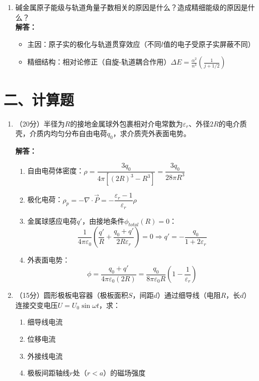 \documentclass{article}
\begin{document}
\begin{enumerate}[label=\arabic*.]
    \item 碱金属原子能级与轨道角量子数相关的原因是什么？造成精细能级的原因是什么？\\
    \textbf{解答：}
    \begin{itemize}
        \item 主因：原子实的极化与轨道贯穿效应（不同$l$值的电子受原子实屏蔽不同）
        \item 精细结构：相对论修正（自旋-轨道耦合作用）$\Delta E = \frac{\alpha^2}{n^3}\left( \frac{1}{j+1/2} \right)$
    \end{itemize}
\end{enumerate}

\section*{二、计算题}
\begin{enumerate}[label=\arabic*.]
    \item （20分）半径为$R$的接地金属球外包裹相对介电常数为$\varepsilon_r$、外径$2R$的电介质壳，介质内均匀分布自由电荷$q_0$，求介质壳外表面电势。
    
    \textbf{解答：}
    \begin{enumerate}
        \item 自由电荷体密度：$\rho = \dfrac{3q_0}{4\pi[(2R)^3 - R^3]} = \dfrac{3q_0}{28\pi R^3}$
        \item 极化电荷：$\rho_p = -\nabla \cdot \vec{P} = -\dfrac{\varepsilon_r-1}{\varepsilon_r}\rho$
        \item 金属球感应电荷$q'$，由接地条件$\phi_{total}(R) = 0$：
        $$
        \dfrac{1}{4\pi\varepsilon_0}\left( \dfrac{q'}{R} + \dfrac{q_0 + q'}{2R\varepsilon_r} \right) = 0 \Rightarrow q' = -\dfrac{q_0}{1+2\varepsilon_r}
        $$
        \item 外表面电势：
        $$
        \phi = \dfrac{q_0 + q'}{4\pi\varepsilon_0(2R)} = \dfrac{q_0}{8\pi\varepsilon_0 R}\left(1 - \dfrac{1}{\varepsilon_r}\right)
        $$
    \end{enumerate}

    \item （15分）圆形极板电容器（极板面积$S$，间距$d$）通过细导线（电阻$R$，长$d$）连接交变电压$U=U_0\sin\omega t$，求：
    \begin{enumerate}
        \item 细导线电流
        \item 位移电流
        \item 外接线电流
        \item 极板间距轴线$r$处（$r<a$）的磁场强度
    \end{enumerate}
    

\end{enumerate}
\end{document}
